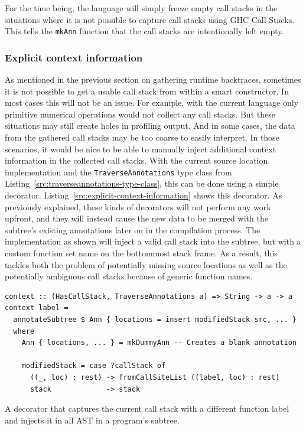 \documentclass[fontsize=11pt,a4paper,parskip=half,numbers=noenddot]{scrartcl}
\newcommand{\hask}[1]{\texttt{#1}}
\begin{document}
For the time being, the language will simply freeze empty call stacks in the
situations where it is not possible to capture call stacks using GHC Call
Stacks. This tells the \hask{mkAnn} function that the call stacks are
intentionally left empty.

\subsubsection{Explicit context information}\label{sec:explicit-context-information}


As mentioned in the previous section on gathering runtime backtraces, sometimes
it is not possible to get a usable call stack from within a smart constructor.
In most cases this will not be an issue. For example, with the current language
only primitive numerical operations would not collect any call stacks. But these
situations may still create holes in profiling output. And in some cases, the
data from the gathered call stacks may be too coarse to easily interpret. In
those scenarios, it would be nice to be able to manually inject additional
context information in the collected call stacks. With the current source
location implementation and the \hask{TraverseAnnotations} type class from
Listing~\ref{src:traverseannotations-type-class}, this can be done using a
simple decorator. Listing~\ref{src:explicit-context-information} shows this
decorator. As previously explained, these kinds of decorators will not perform
any work upfront, and they will instead cause the new data to be merged with the
subtree's existing annotations later on in the compilation process. The
implementation as shown will inject a valid call stack into the subtree, but
with a custom function set name on the bottommost stack frame. As a result, this
tackles both the problem of potentially missing source locations as well as the
potentially ambiguous call stacks because of generic function names.

\begin{listing}[!th]
\begin{verbatim}
context :: (HasCallStack, TraverseAnnotations a) => String -> a -> a
context label =
  annotateSubtree $ Ann { locations = insert modifiedStack src, ... }
  where
    Ann { locations, ... } = mkDummyAnn -- Creates a blank annotation

    modifiedStack = case ?callStack of
      ((_, loc) : rest) -> fromCallSiteList ((label, loc) : rest)
      stack             -> stack
\end{verbatim}
\caption{A decorator that captures the current call stack with a different function label and injects it in all AST in a program's subtree.}\label{src:explicit-context-information}
\end{listing}
\end{document}
